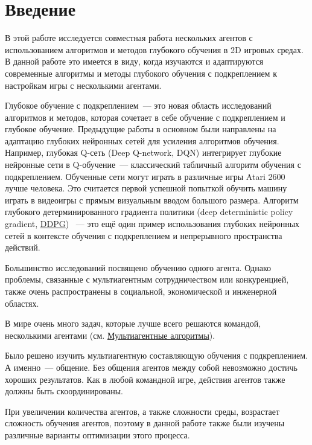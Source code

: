 \chapter*{Введение} \label{intro}%

В этой работе исследуется совместная работа нескольких агентов с использованием алгоритмов и методов глубокого обучения в 2D игровых средах. В данной работе это имеется в виду, когда изучаются и адаптируются современные алгоритмы и методы глубокого обучения с подкреплением к настройкам игры с несколькими агентами.

Глубокое обучение с подкреплением~--- это новая область исследований алгоритмов и методов, которая сочетает в себе обучение с подкреплением и глубокое обучение. Предыдущие работы в основном были направлены на адаптацию глубоких нейронных сетей для усиления алгоритмов обучения. Например, глубокая Q-сеть (Deep Q-network, DQN) \cite{Mnih2015} интегрирует глубокие нейронные сети в Q-обучение~--- классический табличный алгоритм обучения с подкреплением. Обученные сети могут играть в различные игры Atari 2600 \cite{Bellemare_2013} лучше человека. Это считается первой успешной попыткой обучить машину играть в видеоигры с прямым визуальным вводом большого размера. Алгоритм глубокого детерминированного градиента политики (deep deterministic policy gradient, \hyperref[acr:ddpg]{DDPG}) \cite{lillicrap2015continuous}~--- это ещё один пример использования глубоких нейронных сетей в контексте обучения с подкреплением и непрерывного пространства действий.

Большинство исследований посвящено обучению одного агента. Однако проблемы, связанные с мультиагентным сотрудничеством или конкуренцией, также очень распространены в социальной, экономической и инженерной областях.

В мире очень много задач, которые лучше всего решаются командой, несколькими агентами (см. \hyperref[ch2:ma-algs]{Мультиагентные алгоритмы}).

Было решено изучить мультиагентную составляющую обучения с подкреплением. А именно~--- общение. Без общения агентов между собой невозможно достичь хороших результатов. Как в любой командной игре, действия агентов также должны быть скоординированы.

При увеличении количества агентов, а также сложности среды, возрастает сложность обучения агентов, поэтому в данной работе также были изучены различные варианты оптимизации этого процесса.

